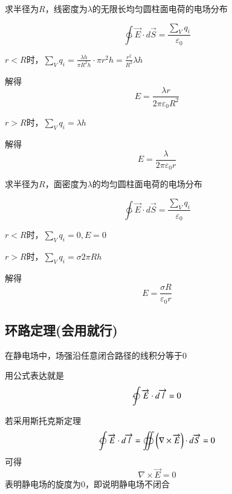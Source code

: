 \documentclass[lang=cn,10pt]{elegantbook}
\begin{document}
		\begin{example}
			求半径为$R$，线密度为$\lambda$的无限长均匀圆柱面电荷的电场分布
		\end{example}
		\begin{solution}
			\begin{equation*}
				\ointctrclockwise{\overrightarrow{E}\cdot d\overrightarrow{S}}=\frac{\sum_V{q_i}}{\varepsilon _0}
			\end{equation*}
			
			$r<R$时，$\sum_V{q_i}=\frac{\lambda h}{\pi R^{2}h}\cdot \pi r^{2}h=\frac{r^{2}}{R^{2}}\lambda h$
			
			解得
			\begin{equation*}
				E=\frac{\lambda r}{2\pi \varepsilon_{0}R^{2}}
			\end{equation*}
			
			$r>R$时，$\sum_V{q_i}=\lambda h$
			
			解得
			\begin{equation*}
				E=\frac{\lambda}{2\pi \varepsilon_{0} r}
			\end{equation*}
		\end{solution}
		\begin{example}
			求半径为$R$，面密度为$\lambda$的均匀圆柱面电荷的电场分布
		\end{example}
		\begin{solution}		
			\begin{equation*}
				\ointctrclockwise{\overrightarrow{E}\cdot d\overrightarrow{S}}=\frac{\sum_V{q_i}}{\varepsilon _0}
			\end{equation*}
			
			$r<R$时，$\sum_V{q_i}=0,E=0$
			
			$r>R$时，$\sum_V{q_i}=
			\sigma 2\pi Rh$
			
			解得
			\begin{equation*}
				E=\frac{\sigma R}{\varepsilon_{0}r}
			\end{equation*}
		\end{solution}
		\subsection{环路定理(会用就行)}
		\begin{theorem}[环路定理]
			在静电场中，场强沿任意闭合路径的线积分等于0
			
			用公式表达就是
			\begin{equation*}
				\ointclockwise{\overrightarrow{E}\cdot d\overrightarrow{l}}=0
			\end{equation*}
		\end{theorem}
		\begin{note}
			若采用斯托克斯定理
			\begin{equation*}
				\ointclockwise{\overrightarrow{E}\cdot d\overrightarrow{l}}=\oiint{\left( \nabla \times \overrightarrow{E} \right)}\cdot d\overrightarrow{S}=0
			\end{equation*}
			可得
			\begin{equation*}
				\nabla \times \overrightarrow{E}=0
			\end{equation*}
			表明静电场的旋度为0，即说明静电场不闭合
		\end{note}
\end{document}
